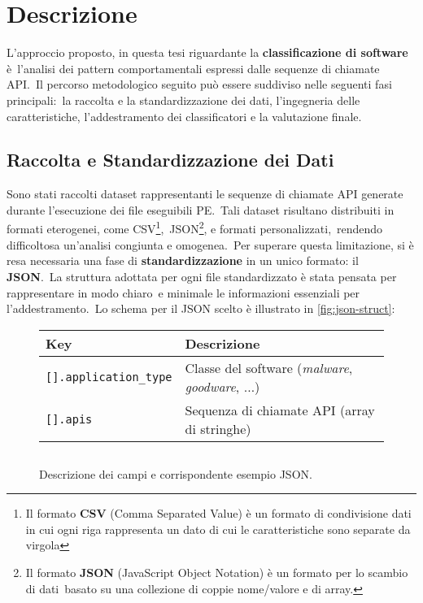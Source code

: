 \section{Descrizione}

L'approccio proposto, in questa tesi riguardante la \textbf{classificazione di software} è\
l'analisi dei pattern comportamentali espressi dalle sequenze di chiamate API.\
Il percorso metodologico seguito può essere suddiviso nelle seguenti fasi principali:\
la raccolta e la standardizzazione dei dati, l'ingegneria delle caratteristiche, l'addestramento dei classificatori
e la valutazione finale.

\subsection{Raccolta e Standardizzazione dei Dati}

Sono stati raccolti dataset rappresentanti le sequenze di chiamate API generate durante l'esecuzione dei file eseguibili PE.\
Tali dataset risultano distribuiti in formati eterogenei, come CSV\footnote{Il formato \textbf{CSV} (Comma Separated Value) è un formato di condivisione dati in cui ogni
    riga rappresenta un dato di cui le caratteristiche sono separate da virgola },\
JSON\footnote{Il formato \textbf{JSON} (JavaScript Object Notation) è un formato per lo scambio di dati\
    basato su una collezione di coppie nome/valore e di array.}, e formati personalizzati,\
rendendo difficoltosa un'analisi congiunta e omogenea.\
Per superare questa limitazione, si è resa necessaria una fase di \textbf{standardizzazione} in un unico formato:
il \textbf{JSON}.\
La struttura adottata per ogni file standardizzato è stata pensata per rappresentare in modo chiaro\
e minimale le informazioni essenziali per l'addestramento.\
Lo schema per il JSON scelto è illustrato in \autoref{fig:json-struct}:

\begin{figure}[h!]
    \centering
    \renewcommand{\arraystretch}{1.3}
    \begin{tabular}{p{0.25\textwidth} p{0.65\textwidth}}
        \toprule
        \textbf{Key}                  & \textbf{Descrizione}                                           \\
        \midrule
        \texttt{[].application\_type} & Classe del software (\emph{malware}, \emph{goodware}, $\dots$) \\
        \texttt{[].apis}              & Sequenza di chiamate API (array di stringhe)                   \\
        \bottomrule
    \end{tabular}

    \vspace{4mm} %

    \inputminted[fontsize=\small]{json}{approccio-proposto/example.json}
    \caption{Descrizione dei campi e corrispondente esempio JSON.}
    \label{fig:json-struct}
\end{figure}

